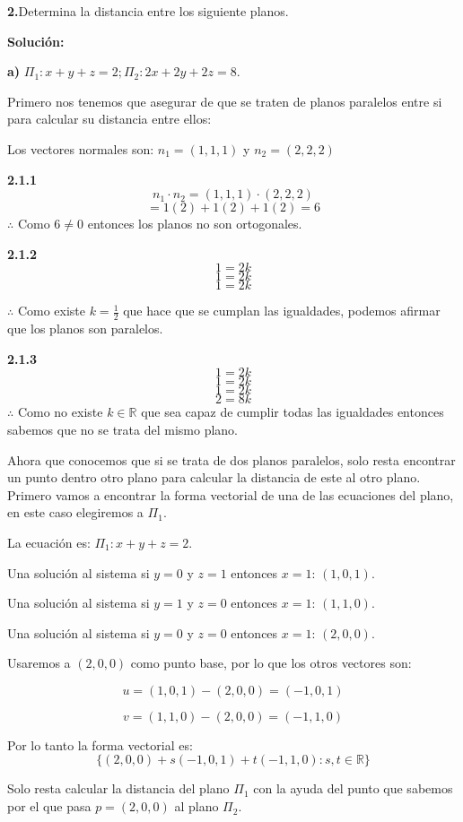 \documentclass{article}
\begin{document}
\textbf{2.}Determina la distancia entre los siguiente planos.
\vspace{10pt}

\textbf{Solución:}
\vspace*{10pt}

\textbf{a)} $\Pi_1 :x+y+z=2;\Pi_2 :2x+2y+2z=8$.
\vspace{10pt}

Primero nos tenemos que asegurar de que se traten de planos paralelos entre si para calcular su distancia entre ellos:

Los vectores normales son: $n_1 =(1,1,1)$ y $n_2 = (2,2,2)$

\textbf{2.1.1}
$$n_1\cdot n_2 = (1,1,1) \cdot (2,2,2)$$
$$= 1(2)+1(2)+1(2) = 6$$
$\therefore$ Como $6\neq 0$ entonces los planos no son ortogonales. 
\vspace{10pt}

\textbf{2.1.2}
$$1 = 2k$$
$$1 = 2k$$
$$1 = 2k$$

$\therefore$ Como existe $k=\frac{1}{2}$ que hace que se cumplan las igualdades, podemos afirmar que los planos son paralelos.
\vspace{10pt}

\textbf{2.1.3}
$$1 = 2k$$
$$1 = 2k$$
$$1 = 2k$$
$$2 = 8k$$
$\therefore$ Como no existe $k \in \mathbb{R}$ que sea capaz de cumplir todas las igualdades entonces sabemos que no se trata del mismo plano. 

Ahora que conocemos que si se trata de dos planos paralelos, solo resta encontrar un punto dentro otro plano para calcular la distancia de este al otro plano.
Primero vamos a encontrar la forma vectorial de una de las ecuaciones del plano, en este caso elegiremos a $\Pi_1$.

La ecuación es: $\Pi_1 :x+y+z=2$. 

Una solución al sistema si $y=0$ y $z = 1$ entonces $x=1$: $(1,0,1)$.

Una solución al sistema si $y=1$ y $z = 0$ entonces $x=1$: $(1,1,0)$.

Una solución al sistema si $y=0$ y $z = 0$ entonces $x=1$: $(2,0,0)$.

Usaremos a $(2,0,0)$ como punto base, por lo que los otros vectores son:

$$u = (1,0,1)-(2,0,0) =(-1,0,1)$$

$$v = (1,1,0)-(2,0,0) =(-1,1,0)$$

Por lo tanto la forma vectorial es: 
$$\{(2,0,0)+s(-1,0,1)+t(-1,1,0): s,t \in \mathbb{R}\}$$

Solo resta calcular la distancia del plano $\Pi_1$ con la ayuda del punto que sabemos por el que pasa $p =(2,0,0)$ al plano $\Pi_2$.
\end{document}
